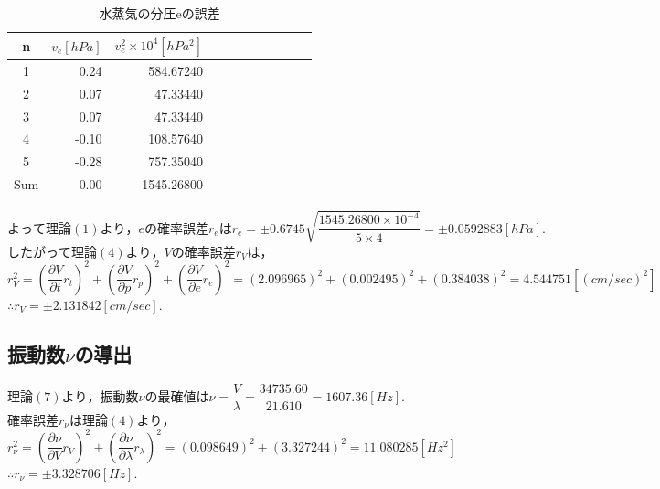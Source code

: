 \documentclass[a4paper,1pt]{jsarticle}
\begin{document}
\begin{table}[H]
  \caption{水蒸気の分圧eの誤差}
  \label{table:SpeedOfLight}
  \centering
  \begin{tabular}{|c||r|r|r|r|r|r|r|r|r|r|}
    \hline
    n & $v_e[hPa]$ & $v_e^2\times 10^4[hPa^2]$ \\
    \hline\hline
    
    1 & 0.24 & 584.67240 \\
    2 & 0.07 & 47.33440 \\
    3 & 0.07 & 47.33440 \\
    4 & -0.10 & 108.57640 \\
    5 & -0.28 & 757.35040 \\
   

   
    
    \hline\hline
    Sum & 0.00 & 1545.26800 \\
    \hline
  \end{tabular}


\end{table}

$よって理論(1)より，eの確率誤差r_eはr_e=\pm0.6745\sqrt{\dfrac{1545.26800\times 10^{-4}}{5\times 4}}=\pm0.0592883[hPa].$\\

$したがって理論(4)より，Vの確率誤差r_Vは，$\\

$r_V^2=\left(\dfrac{\partial V}{\partial t}r_t\right)^2+\left(\dfrac{\partial V}{\partial p}r_p\right)^2+\left(\dfrac{\partial V}{\partial e}r_e\right)^2=(2.096965)^2+(0.002495)^2+(0.384038)^2=4.544751 [(cm/sec)^2]$\\

$\therefore r_V=\pm2.131842[cm/sec].$

\subsection*{振動数$\nu $の導出}

$理論(7)より，振動数\nu の最確値は\nu =\dfrac{V}{\lambda }=\dfrac{34735.60}{21.610}=1607.36[Hz].$\\

$確率誤差r_\nu は理論(4)より，$\\

$r_\nu ^2=\left(\dfrac{\partial \nu }{\partial V}r_V \right)^2+\left(\dfrac{\partial \nu }{\partial \lambda }r_\lambda \right)^2=(0.098649)^2+(3.327244)^2=11.080285[Hz^2]$\\

$\therefore r_\nu = \pm 3.328706[Hz].$\\
\end{document}
